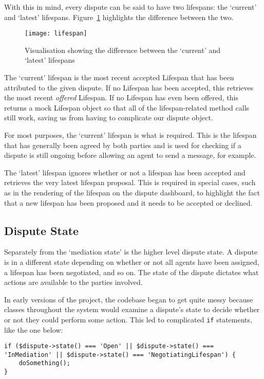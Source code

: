 With this in mind, every dispute can be said to have two lifespans: the `current' and `latest' lifespans. Figure~\ref{uml:lifespan} highlights the difference between the two. 

\begin{figure}[h!]
  \centering
    \ifimages
    \texttt{[image: lifespan]}
    \fi
  \caption{Visualisation showing the difference between the `current' and `latest' lifespans}
  \label{uml:lifespan}
\end{figure}

The `current' lifespan is the most recent accepted Lifespan that has been attributed to the given dispute. If no Lifespan has been accepted, this retrieves the most recent \emph{offered} Lifespan. If no Lifespan has even been offered, this returns a mock Lifespan object so that all of the lifespan-related method calls still work, saving us from having to complicate our dispute object.

For most purposes, the `current' lifespan is what is required. This is the lifespan that has generally been agreed by both parties and is used for checking if a dispute is still ongoing before allowing an agent to send a message, for example.

The `latest' lifespan ignores whether or not a lifespan has been accepted and retrieves the very latest lifespan proposal. This is required in special cases, such as in the rendering of the lifespan on the dispute dashboard, to highlight the fact that a new lifespan has been proposed and it needs to be accepted or declined.

\subsection{Dispute State}

Separately from the `mediation state' is the higher level dispute state. A dispute is in a different state depending on whether or not all agents have been assigned, a lifespan has been negotiated, and so on. The state of the dispute dictates what actions are available to the parties involved.

In early versions of the project, the codebase began to get quite messy because classes throughout the system would examine a dispute's state to decide whether or not they could perform some action. This led to complicated \lstinline{if} statements, like the one below:

\begin{lstlisting}
if ($dispute->state() === 'Open' || $dispute->state() === 'InMediation' || $dispute->state() === 'NegotiatingLifespan') {
    doSomething();
}
\end{lstlisting}

